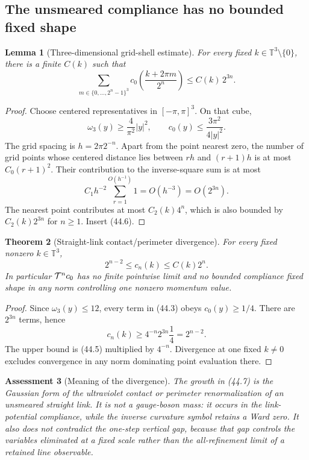 \documentclass[11pt,oneside]{book}
\newtheorem{theorem}{Theorem}[chapter]
\newtheorem{lemma}[theorem]{Lemma}
\newtheorem{assessment}[theorem]{Assessment}
\theoremstyle{definition}
\theoremstyle{remark}
\begin{document}
\subsection{The unsmeared compliance has no bounded fixed shape}

\begin{lemma}[Three-dimensional grid-shell estimate]
\label{lem:e8v44-grid-shell}
For every fixed \(k\in\mathbb T^3\setminus\{0\}\), there is a finite
\(C(k)\) such that
\[
 \sum_{m\in\{0,\ldots,2^n-1\}^3}
 c_0\left(\frac{k+2\pi m}{2^n}\right)
 \le C(k)\,2^{3n}.                                              \tag{44.5}
\]
\end{lemma}

\begin{proof}
Choose centered representatives in \([-\pi,\pi]^3\).  On that cube,
\[
 \omega_3(y)\ge\frac4{\pi^2}|y|^2,
 \qquad
 c_0(y)\le\frac{3\pi^2}{4|y|^2}.                               \tag{44.6}
\]
The grid spacing is \(h=2\pi2^{-n}\).  Apart from the point nearest
zero, the number of grid points whose centered distance lies between
\(rh\) and \((r+1)h\) is at most \(C_0(r+1)^2\).  Their contribution
to the inverse-square sum is at most
\[
 C_1h^{-2}\sum_{r=1}^{O(h^{-1})}1=O(h^{-3})=O(2^{3n}).
\]
The nearest point contributes at most \(C_2(k)4^n\), which is also
bounded by \(C_2(k)2^{3n}\) for \(n\ge1\).  Insert (44.6).
\end{proof}

\begin{theorem}[Straight-link contact/perimeter divergence]
\label{thm:e8v44-perimeter-divergence}
For every fixed nonzero \(k\in\mathbb T^3\),
\[
 \boxed{
 2^{n-2}\le c_n(k)\le C(k)2^n.}                                \tag{44.7}
\]
In particular \({\cal T}^nc_0\) has no finite pointwise limit and no
bounded compliance fixed shape in any norm controlling one nonzero
momentum value.
\end{theorem}

\begin{proof}
Since \(\omega_3(y)\le12\), every term in (44.3) obeys
\(c_0(y)\ge1/4\).  There are \(2^{3n}\) terms, hence
\[
 c_n(k)\ge4^{-n}2^{3n}\frac14=2^{n-2}.
\]
The upper bound is (44.5) multiplied by \(4^{-n}\).  Divergence at
one fixed \(k\ne0\) excludes convergence in any norm dominating
point evaluation there.
\end{proof}

\begin{assessment}[Meaning of the divergence]
\label{ass:e8v44-perimeter-meaning}
The growth in (44.7) is the Gaussian form of the ultraviolet contact
or perimeter renormalization of an unsmeared straight link.  It is
not a gauge-boson mass: it occurs in the link-potential compliance,
while the inverse curvature symbol retains a Ward zero.  It also
does not contradict the one-step vertical gap, because that gap
controls the variables eliminated at a fixed scale rather than the
all-refinement limit of a retained line observable.
\end{assessment}
\end{document}

